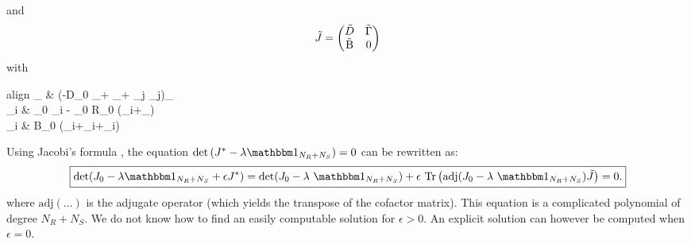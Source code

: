 \documentclass[12pt, titlepage, twoside, openright]{report}
\begin{document}
	 and
	 \begin{equation}
	 \tilde{J} = \begin{pmatrix}
	 \tilde{D} & \tilde{\Gamma} \\
	 \tilde{\text{B}} & 0
	 \end{pmatrix}
	 \end{equation}
	 with
	 \begin{empheq}{align}
	 _{\mu \nu} &  \left(-D_0 _\mu + _\mu+  \sum_j \tilde{\alpha}_{\mu j}\right)\delta_{\mu \nu} \\
	 \tilde{\Gamma}_{\mu i} &  \alpha_0 \tilde{\alpha}_{\mu i} - \gamma_0 R_0 \left(\tilde{\gamma}_{i\mu}+_\mu\right) \\
	 _{i \mu} &  B_0 \left(\tilde{\sigma}_{i\mu}+\tilde{\gamma}_{i\mu}+_i\right)
	 \end{empheq}
	Using Jacobi's formula \cite{magnus_matrix_2019}, the equation $\det\left(J^*-\lambda \identity{N_R+N_S}\right)=0$ can be rewritten as:
	\begin{equation}
	\boxed{
	\det(J_0-\lambda \identity{N_R+N_S} + \epsilon J^*)=\det(J_0-\lambda \identity{N_R+N_S})+\epsilon \ \trace{\text{adj}(J_0-\lambda \identity{N_R+N_S})\tilde{J}}=0.
	}\label{eq : determinant variance first order}
	\end{equation}
	where $\text{adj}\left(\dots\right)$ is the adjugate operator (\ie which yields the transpose of the cofactor matrix). This equation is a complicated polynomial of degree $N_R+N_S$. We do not know how to find an easily computable solution for $\epsilon > 0$. An explicit solution can however be computed when $\epsilon = 0$.
\end{document}
